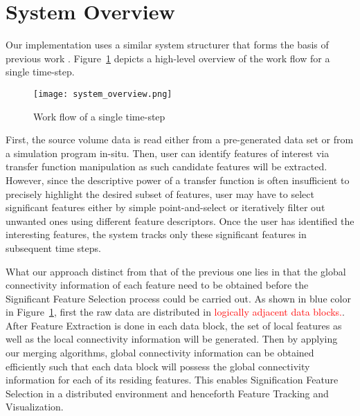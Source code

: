\section{System Overview}
Our implementation uses a similar system structurer that forms the basis of previous work \cite{Muelder2009}. Figure~\ref{fig:system-overview} depicts a high-level overview of the work flow for a single time-step.

\begin{figure}[ht]
	\centering
	\texttt{[image: system\_overview.png]}
	\caption{Work flow of a single time-step}
	\label{fig:system-overview}
\end{figure}

First, the source volume data is read either from a pre-generated data set or from a simulation program in-situ. Then, user can identify features of interest via transfer function manipulation as such candidate features will be extracted. However, since the descriptive power of a transfer function is often insufficient to precisely highlight the desired subset of features, user may have to select significant features either by simple point-and-select or iteratively filter out unwanted ones using different feature descriptors. Once the user has identified the interesting features, the system tracks only these significant features in subsequent time steps.

What our approach distinct from that of the previous one lies in that the global connectivity information of each feature need to be obtained before the Significant Feature Selection process could be carried out. As shown in blue color in Figure~\ref{fig:system-overview}, first the raw data are distributed in \textcolor{red}{logically adjacent data blocks.}. After Feature Extraction is done in each data block, the set of local features as well as the local connectivity information will be generated. Then by applying our merging algorithms, global connectivity information can be obtained efficiently such that each data block will possess the global connectivity information for each of its residing features. This enables Signification Feature Selection in a distributed environment and henceforth Feature Tracking and Visualization.